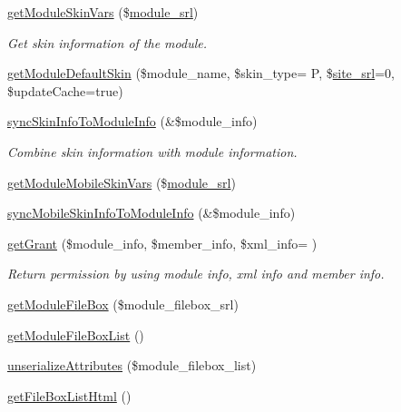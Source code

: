 \begin{DoxyCompactItemize}
\hyperlink{classmoduleModel_aa3828c94af2b1c8b84fafd423038445d}{get\+Module\+Skin\+Vars} (\$\hyperlink{ko_8install_8php_a370bb6450fab1da3e0ed9f484a38b761}{module\+\_\+srl})
\begin{DoxyCompactList}\small\item\em Get skin information of the module. \end{DoxyCompactList}\item 
\hyperlink{classmoduleModel_a0a77bcbc85aa39eebe18687ab6e0b974}{get\+Module\+Default\+Skin} (\$module\+\_\+name, \$skin\+\_\+type= \textquotesingle{}P\textquotesingle{}, \$\hyperlink{ko_8install_8php_a8b1406b4ad1048041558dce6bfe89004}{site\+\_\+srl}=0, \$update\+Cache=true)
\item 
\hyperlink{classmoduleModel_af9179765de4796b45236b62be16eb8fb}{sync\+Skin\+Info\+To\+Module\+Info} (\&\$module\+\_\+info)
\begin{DoxyCompactList}\small\item\em Combine skin information with module information. \end{DoxyCompactList}\item 
\hyperlink{classmoduleModel_aef7f4760b4c1864752d1042e1a0667c8}{get\+Module\+Mobile\+Skin\+Vars} (\$\hyperlink{ko_8install_8php_a370bb6450fab1da3e0ed9f484a38b761}{module\+\_\+srl})
\item 
\hyperlink{classmoduleModel_ae90cd832480cf8c46e96d95c20a63387}{sync\+Mobile\+Skin\+Info\+To\+Module\+Info} (\&\$module\+\_\+info)
\item 
\hyperlink{classmoduleModel_a0d6431efeb3e3d377dbbb20b414ba074}{get\+Grant} (\$module\+\_\+info, \$member\+\_\+info, \$xml\+\_\+info= \textquotesingle{}\textquotesingle{})
\begin{DoxyCompactList}\small\item\em Return permission by using module info, xml info and member info. \end{DoxyCompactList}\item 
\hyperlink{classmoduleModel_a792e14b71d66044513a646a44216be17}{get\+Module\+File\+Box} (\$module\+\_\+filebox\+\_\+srl)
\item 
\hyperlink{classmoduleModel_a8f3a098b40649594a591e5ea8bd15d96}{get\+Module\+File\+Box\+List} ()
\item 
\hyperlink{classmoduleModel_a60ec88f0d61e7a44887bebba8048a18d}{unserialize\+Attributes} (\$module\+\_\+filebox\+\_\+list)
\item 
\hyperlink{classmoduleModel_acf3405bfe791d8bf7d8e7886b9481923}{get\+File\+Box\+List\+Html} ()
\item 

\end{DoxyCompactItemize}
